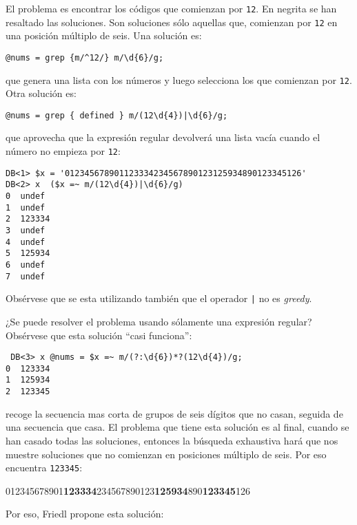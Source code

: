 El problema es encontrar los códigos que comienzan por {\tt 12}. En negrita 
se han resaltado las soluciones.  Son soluciones sólo aquellas que, comienzan
por \verb|12| en una posición múltiplo de seis. 
Una solución es:

\begin{center}
\begin{verbatim}
@nums = grep {m/^12/} m/\d{6}/g;
\end{verbatim}
\end{center}

que genera una lista con los números y luego selecciona los que comienzan por
\verb|12|.
Otra solución es:

\begin{center}
\begin{verbatim}
@nums = grep { defined } m/(12\d{4})|\d{6}/g;
\end{verbatim}
\end{center}

que aprovecha que la expresión regular devolverá una lista vacía cuando
el número no empieza por \verb|12|:
\begin{verbatim}
DB<1> $x = '012345678901123334234567890123125934890123345126'
DB<2> x  ($x =~ m/(12\d{4})|\d{6}/g)
0  undef
1  undef
2  123334
3  undef
4  undef
5  125934
6  undef
7  undef
\end{verbatim}
Obsérvese que se esta utilizando también que el operador \verb#|# no es \emph{greedy}.

¿Se puede resolver el problema usando sólamente una expresión regular?
Obsérvese que esta solución ``casi funciona'':

\begin{center}
\begin{verbatim}
 DB<3> x @nums = $x =~ m/(?:\d{6})*?(12\d{4})/g;
0  123334
1  125934
2  123345
\end{verbatim}
\end{center}

recoge la secuencia mas corta de grupos de seis dígitos que no casan, seguida 
de una secuencia que casa. 
El problema que tiene esta solución 
es al final, cuando se han casado todas las soluciones, entonces 
la búsqueda exhaustiva hará que nos muestre soluciones que no comienzan en posiciones
múltiplo de seis. Por eso encuentra \verb|123345|:
\begin{center}
\begin{tt} 
012345678901{\bf123334}234567890123{\bf125934}890{\bf123345}126
\end{tt} 
\end{center}
Por eso, Friedl propone esta solución:

